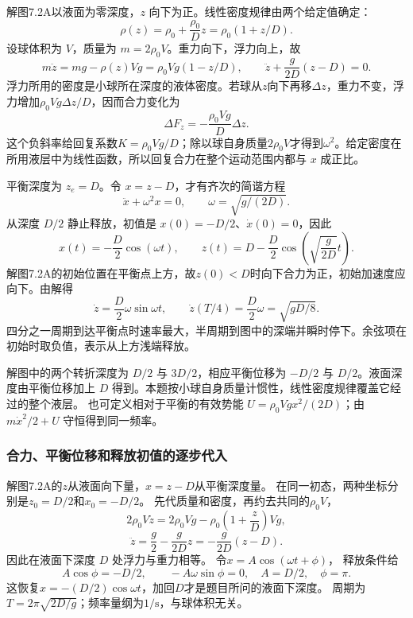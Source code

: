 \documentclass[UTF8,fontset=fandol,a4paper,11pt]{ctexart}
\newcommand{\figcaption}[1]{\par\vspace{2pt}{\small\color{muted}#1}\par}
\begin{document}
\begin{center}\begin{minipage}{\linewidth}\centering{}\figcaption{解图 7.2A}\end{minipage}\end{center}
解图7.2A以液面为零深度，$z$ 向下为正。线性密度规律由两个给定值确定：
\[\rho(z)=\rho_0+\frac{\rho_0}{D}z=\rho_0(1+z/D).\]
设球体积为 $V$，质量为 $m=2\rho_0V$。重力向下，浮力向上，故
\[m\ddot z=mg-\rho(z)Vg
=\rho_0Vg(1-z/D),\qquad
\ddot z+\frac g{2D}(z-D)=0.\]
浮力所用的密度是小球所在深度的液体密度。若球从$z$向下再移$\Delta z$，重力不变，浮力增加$\rho_0Vg\Delta z/D$，因而合力变化为
\[\Delta F_z=-\frac{\rho_0Vg}{D}\Delta z.\]
这个负斜率给回复系数$K=\rho_0Vg/D$；除以球自身质量$2\rho_0V$才得到$\omega^2$。给定密度在所用液层中为线性函数，所以回复合力在整个运动范围内都与 $x$ 成正比。

平衡深度为 $z_e=D$。令 $x=z-D$，才有齐次的简谐方程
\[\ddot x+\omega^2x=0,\qquad\omega=\sqrt{g/(2D)}.\]
从深度 $D/2$ 静止释放，初值是 $x(0)=-D/2$、$\dot x(0)=0$，因此
\[x(t)=-\frac D2\cos(\omega t),\qquad
\boxed{z(t)=D-\frac D2\cos\left(\sqrt{\frac g{2D}}t\right).}\]
解图7.2A的初始位置在平衡点上方，故$z(0)<D$时向下合力为正，初始加速度应向下。由解得
\[\dot z=\frac D2\omega\sin\omega t,
\qquad \dot z(T/4)=\frac D2\omega=\sqrt{gD/8}.\]
四分之一周期到达平衡点时速率最大，半周期到图中的深端并瞬时停下。余弦项在初始时取负值，表示从上方浅端释放。

解图中的两个转折深度为 $D/2$ 与 $3D/2$，相应平衡位移为 $-D/2$ 与 $D/2$。液面深度由平衡位移加上 $D$ 得到。本题按小球自身质量计惯性，线性密度规律覆盖它经过的整个液层。
也可定义相对于平衡的有效势能 $U=\rho_0Vg x^2/(2D)$；由 $m\dot x^2/2+U$ 守恒得到同一频率。
\subsubsection*{合力、平衡位移和释放初值的逐步代入}
解图7.2A的$z$从液面向下量，$x=z-D$从平衡深度量。
在同一初态，两种坐标分别是$z_0=D/2$和$x_0=-D/2$。
先代质量和密度，再约去共同的$\rho_0V$，
\[
2\rho_0V\ddot z=2\rho_0Vg-
\rho_0\left(1+\frac zD\right)Vg,
\]
\[
\ddot z=\frac g2-\frac g{2D}z
=-\frac g{2D}(z-D).
\]
因此在液面下深度 $D$ 处浮力与重力相等。
令$x=A\cos(\omega t+\phi)$，
释放条件给
\[
A\cos\phi=-D/2,\qquad -A\omega\sin\phi=0,
\quad A=D/2,\quad\phi=\pi.
\]
这恢复$x=-(D/2)\cos\omega t$，加回$D$才是题目所问的液面下深度。
周期为$T=2\pi\sqrt{2D/g}$；频率量纲为$1/\mathrm s$，与球体积无关。
\end{document}
